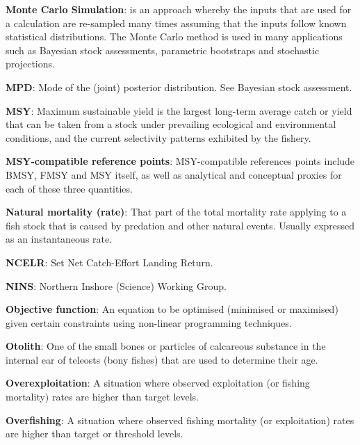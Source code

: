 \documentclass{mpi-plenary}
\theoremstyle{definition}
\theoremstyle{definition}
\theoremstyle{definition}
\theoremstyle{remark}
\begin{document}
\protect\hypertarget{def-monte-carlo-simulation}{}{} \textbf{Monte Carlo
Simulation}: is an approach whereby the inputs that are used for a
calculation are re-sampled many times assuming that the inputs follow
known statistical distributions. The Monte Carlo method is used in many
applications such as Bayesian stock assessments, parametric bootstraps
and stochastic projections.

\protect\hypertarget{def-mpd}{}{} \textbf{MPD}: Mode of the (joint)
posterior distribution. See Bayesian stock assessment.

\protect\hypertarget{def-msy}{}{} \textbf{MSY}: Maximum sustainable
yield is the largest long-term average catch or yield that can be taken
from a stock under prevailing ecological and environmental conditions,
and the current selectivity patterns exhibited by the fishery.

\protect\hypertarget{def-msy-compatible-reference-points}{}{}
\textbf{MSY-compatible reference points}: MSY-compatible references
points include BMSY, FMSY and MSY itself, as well as analytical and
conceptual proxies for each of these three quantities.

\protect\hypertarget{def-natural-mortality-rate}{}{} \textbf{Natural
mortality (rate)}: That part of the total mortality rate applying to a
fish stock that is caused by predation and other natural events. Usually
expressed as an instantaneous rate.

\protect\hypertarget{def-ncelr}{}{} \textbf{NCELR}: Set Net Catch-Effort
Landing Return.

\protect\hypertarget{def-nins}{}{} \textbf{NINS}: Northern Inshore
(Science) Working Group.

\protect\hypertarget{def-objective-function}{}{} \textbf{Objective
function}: An equation to be optimised (minimised or maximised) given
certain constraints using non-linear programming techniques.

\protect\hypertarget{def-otolith}{}{} \textbf{Otolith}: One of the small
bones or particles of calcareous substance in the internal ear of
teleosts (bony fishes) that are used to determine their age.

\protect\hypertarget{def-overexploitation}{}{}
\textbf{Overexploitation}: A situation where observed exploitation (or
fishing mortality) rates are higher than target levels.

\protect\hypertarget{def-overfishing}{}{} \textbf{Overfishing}: A
situation where observed fishing mortality (or exploitation) rates are
higher than target or threshold levels.
\end{document}
